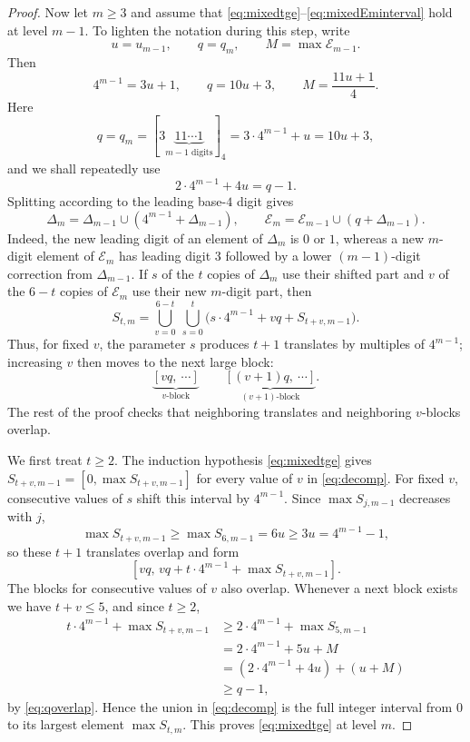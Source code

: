 \documentclass[12pt]{article}
\theoremstyle{plain}
\begin{document}
\begin{proof}
Now let $m\geq3$ and assume that
\eqref{eq:mixedtge}--\eqref{eq:mixedEminterval} hold at level $m-1$.
To lighten the notation during this step, write
\[
 u=u_{m-1},\qquad q=q_m,
 \qquad M=\max\mathcal E_{m-1}.
\]
Then
\[
 4^{m-1}=3u+1,\qquad q=10u+3,
 \qquad M=\frac{11u+1}{4}.
\]
Here
\begin{equation}\label{eq:qmdef}
 q=q_m=[3\underbrace{11\cdots1}_{m-1\text{ digits}}]_4
      =3\cdot4^{m-1}+u=10u+3,
\end{equation}
and we shall repeatedly use
\begin{equation}\label{eq:qoverlap}
 2\cdot4^{m-1}+4u=q-1.
\end{equation}
Splitting according to the leading base-$4$ digit gives
\[
 \Delta_m=\Delta_{m-1}\cup(4^{m-1}+\Delta_{m-1}),\qquad
 \mathcal E_{m}=\mathcal E_{m-1}\cup(q+\Delta_{m-1}).
\]
Indeed, the new leading digit of an element of $\Delta_m$ is $0$ or $1$,
whereas a new $m$-digit element of $\mathcal E_{m}$ has leading digit $3$
followed by a lower $(m-1)$-digit correction from $\Delta_{m-1}$.  If $s$ of
the $t$ copies of $\Delta_m$ use their shifted part and $v$ of the $6-t$
copies of $\mathcal E_{m}$ use their new $m$-digit part, then
\begin{equation}\label{eq:decomp}
 S_{t,m}=\bigcup_{v=0}^{6-t}\ \bigcup_{s=0}^{t}
 \bigl(s\cdot4^{m-1}+vq+S_{t+v,m-1}\bigr).
\end{equation}
Thus, for fixed $v$, the parameter $s$ produces $t+1$ translates by
multiples of $4^{m-1}$; increasing $v$ then moves to the next large block:
\[
 \underbrace{[vq,\ \cdots]}_{v\text{-block}}
 \qquad
 \underbrace{[(v+1)q,\ \cdots]}_{(v+1)\text{-block}}.
\]
The rest of the proof checks that neighboring translates and neighboring
$v$-blocks overlap.

We first treat $t\geq2$.  The induction hypothesis
\eqref{eq:mixedtge} gives $S_{t+v,m-1}=[0,\max S_{t+v,m-1}]$ for every
value of $v$ in \eqref{eq:decomp}.  For fixed $v$, consecutive values of
$s$ shift this interval by $4^{m-1}$.  Since $\max S_{j,m-1}$ decreases
with $j$,
\[
 \max S_{t+v,m-1}\geq\max S_{6,m-1}=6u
     \geq3u=4^{m-1}-1,
\]
so these $t+1$ translates overlap and form
\[
 [vq,\,vq+t\cdot4^{m-1}+\max S_{t+v,m-1}].
\]
The blocks for consecutive values of $v$ also overlap.  Whenever a next
block exists we have $t+v\leq5$, and since $t\geq2$,
\[
\begin{aligned}
 t\cdot4^{m-1}+\max S_{t+v,m-1}
 &\geq2\cdot4^{m-1}+\max S_{5,m-1}\\
 &=2\cdot4^{m-1}+5u+M\\
 &=(2\cdot4^{m-1}+4u)+(u+M)\\
 &\geq q-1,
\end{aligned}
\]
by \eqref{eq:qoverlap}.  Hence the union in \eqref{eq:decomp} is the
full integer interval from $0$ to its largest element $\max S_{t,m}$.
This proves \eqref{eq:mixedtge} at level $m$.


\end{proof}
\end{document}
